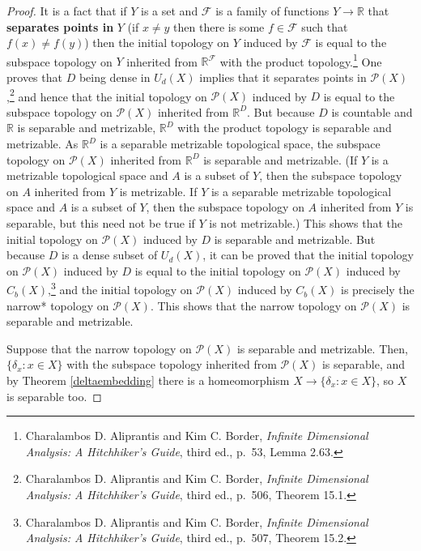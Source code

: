 \documentclass{article}
\theoremstyle{definition}
\theoremstyle{definition}
\begin{document}
\begin{proof}
It is a fact that if $Y$ is a set and $\mathscr{F}$ is a family of functions $Y \to \mathbb{R}$ that \textbf{separates points in} $Y$ (if
$x \neq y$ then there is some $f \in \mathscr{F}$ such that $f(x) \neq f(y)$) then 
the initial topology on $Y$ induced by $\mathscr{F}$ is equal to the subspace topology on $Y$ inherited from
$\mathbb{R}^{\mathscr{F}}$ with the product topology.\footnote{Charalambos D. 
Aliprantis and Kim C. Border, {\em Infinite Dimensional Analysis: A Hitchhiker's Guide}, third ed., p.~53, Lemma 2.63.}
One proves that  $D$ being dense in $U_d(X)$ implies that it separates points in $\mathscr{P}(X)$,\footnote{Charalambos D. 
Aliprantis and Kim C. Border, {\em Infinite Dimensional Analysis: A Hitchhiker's Guide}, third ed., p.~506, Theorem 15.1.}
and hence that the initial topology on $\mathscr{P}(X)$ induced by $D$ is equal to the subspace topology on $\mathscr{P}(X)$ inherited
from $\mathbb{R}^D$. But because $D$ is countable and $\mathbb{R}$ is separable and metrizable,  $\mathbb{R}^D$ with the product topology is 
separable and metrizable. 
As $\mathbb{R}^D$ is a separable
metrizable topological space, the subspace topology on $\mathscr{P}(X)$  inherited from $\mathbb{R}^D$ is separable and metrizable. (If $Y$ is a metrizable
topological space and $A$ is a subset of $Y$, then the subspace topology on $A$ inherited from $Y$ is metrizable. If $Y$ is a separable metrizable
topological space and $A$ is a subset of $Y$, then the subspace topology on $A$ inherited from $Y$ is separable, but this need not be true if $Y$ is not metrizable.)
This shows that the initial topology on $\mathscr{P}(X)$ induced by $D$ is separable and metrizable. But 
because $D$ is a dense subset of $U_d(X)$, it can be   proved that the initial topology on $\mathscr{P}(X)$ induced by $D$ is equal to the initial
topology  on $\mathscr{P}(X)$ induced by $C_b(X)$,\footnote{Charalambos D. 
Aliprantis and Kim C. Border, {\em Infinite Dimensional Analysis: A Hitchhiker's Guide}, third ed., p.~507, Theorem 15.2.} and the initial topology on $\mathscr{P}(X)$ induced
by $C_b(X)$ is precisely the narrow* topology on $\mathscr{P}(X)$. This shows that the narrow topology on $\mathscr{P}(X)$ is separable and metrizable.

Suppose that the narrow topology on $\mathscr{P}(X)$ is separable and metrizable. Then, $\{\delta_x: x \in X\}$ with the subspace topology inherited from
$\mathscr{P}(X)$ is separable, and by Theorem \ref{deltaembedding} there is a homeomorphism $X \to \{\delta_x: x \in X\}$, so $X$ is separable too. 
\end{proof}
\end{document}
